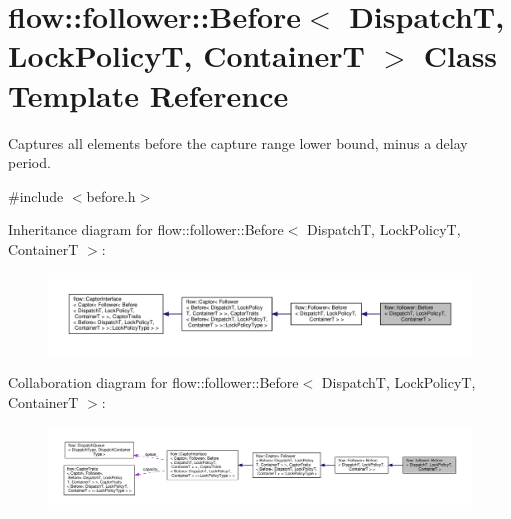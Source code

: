 \hypertarget{classflow_1_1follower_1_1_before}{}\section{flow\+:\+:follower\+:\+:Before$<$ DispatchT, Lock\+PolicyT, ContainerT $>$ Class Template Reference}
\label{classflow_1_1follower_1_1_before}


Captures all elements before the capture range lower bound, minus a delay period.  




{\ttfamily \#include $<$before.\+h$>$}



Inheritance diagram for flow\+:\+:follower\+:\+:Before$<$ DispatchT, Lock\+PolicyT, ContainerT $>$\+:\nopagebreak
\begin{figure}[H]
\begin{center}
\leavevmode
\includegraphics[width=350pt]{classflow_1_1follower_1_1_before__inherit__graph}
\end{center}
\end{figure}


Collaboration diagram for flow\+:\+:follower\+:\+:Before$<$ DispatchT, Lock\+PolicyT, ContainerT $>$\+:\nopagebreak
\begin{figure}[H]
\begin{center}
\leavevmode
\includegraphics[width=350pt]{classflow_1_1follower_1_1_before__coll__graph}
\end{center}
\end{figure}
